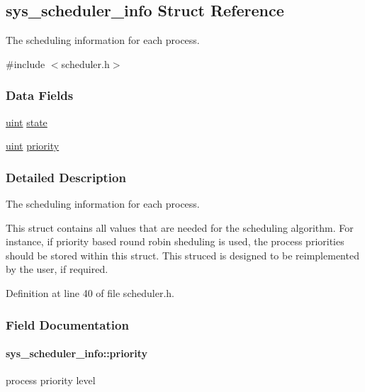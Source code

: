 \hypertarget{structsys__scheduler__info}{}\subsection{sys\+\_\+scheduler\+\_\+info Struct Reference}
\label{structsys__scheduler__info}


The scheduling information for each process.  




{\ttfamily \#include $<$scheduler.\+h$>$}

\subsubsection*{Data Fields}
\begin{DoxyCompactItemize}
\item 
\hyperlink{definitions_8h_a1445ebbbf93d62972255ec5e89a5ab01}{uint} \hyperlink{structsys__scheduler__info_ac43d2cf748d5c052df80179e72c1d355}{state}
\item 
\hyperlink{definitions_8h_a1445ebbbf93d62972255ec5e89a5ab01}{uint} \hyperlink{structsys__scheduler__info_a864ef702aee0479b6e9d002c33aafd70}{priority}
\end{DoxyCompactItemize}


\subsubsection{Detailed Description}
The scheduling information for each process. 

This struct contains all values that are needed for the scheduling algorithm. For instance, if priority based round robin sheduling is used, the process priorities should be stored within this struct. This struced is designed to be reimplemented by the user, if required. 

Definition at line 40 of file scheduler.\+h.



\subsubsection{Field Documentation}
\hypertarget{structsys__scheduler__info_a864ef702aee0479b6e9d002c33aafd70}{}
\paragraph[{priority}]{ sys\+\_\+scheduler\+\_\+info\+::priority}\label{structsys__scheduler__info_a864ef702aee0479b6e9d002c33aafd70}
process priority level 

